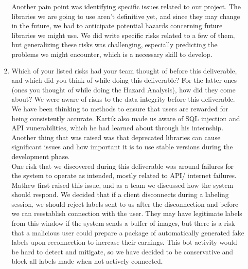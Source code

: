 \documentclass{article}
\begin{document}
\begin{enumerate}
    Another pain point was identifying specific issues related to our project. The libraries we are going to use aren’t definitive yet, and since they may change in the future, 
    we had to anticipate potential hazards concerning future libraries we might use. We did write specific risks related to a few of them, 
    but generalizing these risks was challenging, especially predicting the problems we might encounter, which is a necessary skill to develop.
    

    \item Which of your listed risks had your team thought of before this
    deliverable, and which did you think of while doing this deliverable? For
    the latter ones (ones you thought of while doing the Hazard Analysis), how
    did they come about?
    We were aware of risks to the data integrity before this deliverable. We have been thinking to methods to ensure that users are rewarded for being consistently accurate. Kartik also 
    made us aware of SQL injection and API vunerabilities, which he had learned about through his internship. Another thing that was raised was that deprecated libraries can cause significant 
    issues and how important it is to use stable versions during the development phase.\\
    One risk that we discovered during this deliverable was around failures for the system to operate as intended, mostly related to API/ internet failures. Mathew first raised this issue, and
    as a team we discussed how the system should respond. We decided that if a client disconnects during a labeling session, we should reject labels sent to us after the disconnection and before
    we can reestablish connection with the user. They may have legitimate labels from this window if the system sends a buffer of images, but there is a risk that a malicious user could prepare 
    a package of automatically generated fake labels upon reconnection to increase their earnings. This bot activity would be hard to detect and mitigate, so we have decided to be conservative and block all labels
    made when not actively connected.


\end{enumerate}
\end{document}
